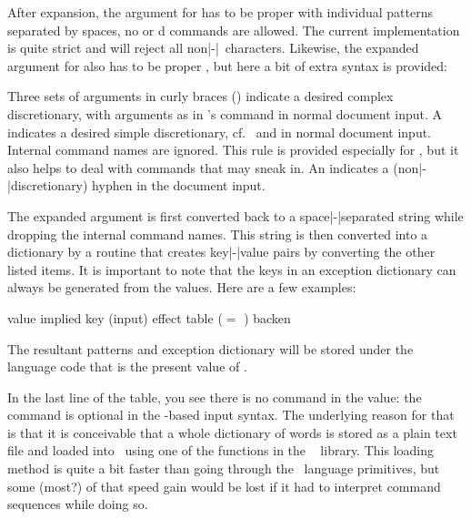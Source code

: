 After expansion, the argument for \type {\patterns} has to be proper  with
individual patterns separated by spaces, no \type {\char} or \type {\chardef}d
commands are allowed. The current implementation is quite strict and will reject
all non|-|\UNICODE\ characters. Likewise, the expanded argument for \type
{\hyphenation} also has to be proper , but here a bit of extra syntax is
provided:

\startitemize[n]
\startitem
    Three sets of arguments in curly braces (\type {{}{}{}}) indicate a desired
    complex discretionary, with arguments as in \type {\discretionary}'s command in
    normal document input.
\stopitem
\startitem
    A \type {-} indicates a desired simple discretionary, cf.\ \type {\-} and
    \type {\discretionary{-}{}{}} in normal document input.
\stopitem
\startitem
    Internal command names are ignored. This rule is provided especially for \type
    {\discretionary}, but it also helps to deal with \type {\relax} commands that
    may sneak in.
\stopitem
\startitem
    An \type {=} indicates a (non|-|discretionary) hyphen in the document input.
\stopitem
\stopitemize

The expanded argument is first converted back to a space|-|separated string while
dropping the internal command names. This string is then converted into a
dictionary by a routine that creates key|-|value pairs by converting the other
listed items. It is important to note that the keys in an exception dictionary
can always be generated from the values. Here are a few examples:

\starttabulate[|l|l|l|]
\FL
\BC value                  \BC implied key (input) \BC effect \NC\NR
\TL
\NC {}         \NC table               \NC {} ($=$ ) \NC\NR
\NC {} \NC backen              \NC {} \NC\NR
\LL
\stoptabulate

The resultant patterns and exception dictionary will be stored under the language
code that is the present value of \type {\language}.

In the last line of the table, you see there is no \type {\discretionary} command
in the value: the command is optional in the \TEX-based input syntax. The
underlying reason for that is that it is conceivable that a whole dictionary of
words is stored as a plain text file and loaded into \LUATEX\ using one of the
functions in the \LUA\  library. This loading method is quite a bit
faster than going through the \TEX\ language primitives, but some (most?) of that
speed gain would be lost if it had to interpret command sequences while doing so.

